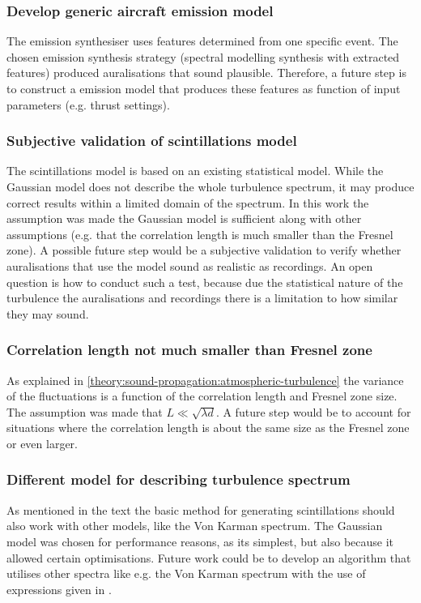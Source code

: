 \subsubsection*{Develop generic aircraft emission model}
The emission synthesiser uses features determined from one specific event. The
chosen emission synthesis strategy (spectral modelling synthesis with extracted features)
produced auralisations that sound plausible. Therefore, a future step
is to construct a emission model that produces these features as function of
input parameters (e.g. thrust settings).

\subsubsection*{Subjective validation of scintillations model}
The scintillations model is based on an existing statistical model. While the
Gaussian model does not describe the whole turbulence spectrum, it may produce
correct results within a limited domain of the spectrum. In this work the
assumption was made the Gaussian model is sufficient along with other
assumptions (e.g. that the correlation length is much smaller than the Fresnel
zone). A possible future step would be a subjective validation to verify whether
auralisations that use the model sound as realistic as recordings. An open
question is how to conduct such a test, because due the statistical nature of
the turbulence the auralisations and recordings there is a limitation to how
similar they may sound.

\subsubsection*{Correlation length not much smaller than Fresnel zone}
As explained in \ref{theory:sound-propagation:atmospheric-turbulence} the
variance of the fluctuations is a function of the correlation length and Fresnel
zone size. The assumption was made that $L \ll \sqrt{\lambda d}$. A future step
would be to account for situations where the correlation length is about the
same size as the Fresnel zone or even larger.

\subsubsection*{Different model for describing turbulence spectrum}
As mentioned in the text the basic method for generating scintillations should
also work with other models, like the Von Karman spectrum. The Gaussian model
was chosen for performance reasons, as its simplest, but also because it allowed
certain optimisations. Future work could be to develop an algorithm
that utilises other spectra like e.g. the Von Karman spectrum with the use of
expressions given in \cite{Ostashev2015}.

